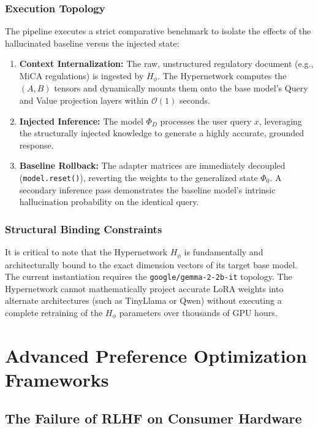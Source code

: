 \documentclass[12pt,a4paper]{report}
\begin{document}
\subsection{Execution Topology}
The pipeline executes a strict comparative benchmark to isolate the effects of the hallucinated baseline versus the injected state:
\begin{enumerate}
    \item \textbf{Context Internalization:} The raw, unstructured regulatory document (e.g., MiCA regulations) is ingested by $H_\phi$. The Hypernetwork computes the $(A, B)$ tensors and dynamically mounts them onto the base model's Query and Value projection layers within $\mathcal{O}(1)$ seconds.
    \item \textbf{Injected Inference:} The model $\Phi_{D}$ processes the user query $x$, leveraging the structurally injected knowledge to generate a highly accurate, grounded response.
    \item \textbf{Baseline Rollback:} The adapter matrices are immediately decoupled (\texttt{model.reset()}), reverting the weights to the generalized state $\Phi_0$. A secondary inference pass demonstrates the baseline model's intrinsic hallucination probability on the identical query.
\end{enumerate}

\subsection{Structural Binding Constraints}
It is critical to note that the Hypernetwork $H_\phi$ is fundamentally and architecturally bound to the exact dimension vectors of its target base model. The current instantiation requires the \texttt{google/gemma-2-2b-it} topology. The Hypernetwork cannot mathematically project accurate LoRA weights into alternate architectures (such as TinyLlama or Qwen) without executing a complete retraining of the $H_\phi$ parameters over thousands of GPU hours. 

\chapter{Advanced Preference Optimization Frameworks}
\label{chap:preference_optimization}

\section{The Failure of RLHF on Consumer Hardware}
\end{document}
